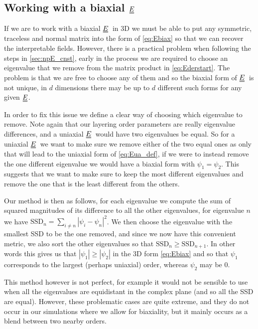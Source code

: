 \documentclass[12pt]{article}
\newcommand{\duf}[2]{\stackunder[0.5pt]{\stackunder[0.8pt]{\stackunder[1pt]{\ensuremath{#1}}{\rule{\widthof{\ensuremath{#2}}*\real{0.9}}{.1ex}}}{\rule{\widthof{\ensuremath{#2}}*\real{0.9}}{.1ex}}}{}}
\newcommand{\du}[1]{\duf{#1}{#1}}
\newcommand{\EE}{\ensuremath{\du{E}}}
\begin{document}
    \subsection{Working with a biaxial \EE}
        If we are to work with a biaxial \EE\ in 3D we must be able to put any symmetric, traceless and normal matrix into the form of \cref{eq:Ebiax} so that we can recover the interpretable fields.
        However, there is a practical problem when following the steps in \cref{sec:npE_cnst}, early in the process we are required to choose an eigenvalue that we remove from the matrix product in \cref{eq:Ederstart}.
        The problem is that we are free to choose any of them and so the biaxial form of \EE\ is not unique, in $d$ dimensions there may be up to $d$ different such forms for any given \EE.

        In order to fix this issue we define a clear way of choosing which eigenvalue to remove.
        Note again that our layering order parameters are really eigenvalue differences, and a uniaxial \EE\ would have two eigenvalues be equal.
        So for a uniaxial \EE\ we want to make sure we remove either of the two equal ones as only that will lead to the uniaxial form of \cref{eq:Eua_def}, if we were to instead remove the one different eigenvalue we would have a biaxial form with $\psi_1=\psi_2$.
        This suggests that we want to make sure to keep the most different eigenvalues and remove the one that is the least different from the others.

        Our method is then as follows, for each eigenvalue we compute the sum of squared magnitudes of its difference to all the other eigenvalues, for eigenvalue $n$ we have $\text{SSD}_n = \sum_{i \neq n} |\psi_i-\psi_n|^2$.
        We then choose the eigenvalue with the smallest SSD to be the one removed, and since we now have this convenient metric, we also sort the other eigenvalues so that $\text{SSD}_n \geq \text{SSD}_{n+1}$.
        In other words this gives us that $|\psi_1| \geq |\psi_2|$ in the 3D form \cref{eq:Ebiax} and so that $\psi_1$ corresponds to the largest (perhaps uniaxial) order, whereas $\psi_2$ may be 0.

        This method however is not perfect, for example it would not be sensible to use when all the eigenvalues are equidistant in the complex plane (and so all the SSD are equal).
        However, these problematic cases are quite extreme, and they do not occur in our simulations where we allow for biaxiality, but it mainly occurs as a blend between two nearby orders.
\end{document}
